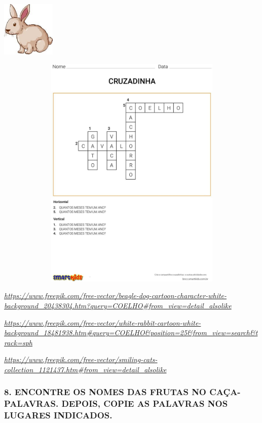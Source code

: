 \includegraphics[width=0.99722in,height=1.03125in]{media/image95.jpg}

\includegraphics[width=5.90556in,height=4.47101in]{media/image96.jpg}

\href{https://www.freepik.com/free-vector/beagle-dog-cartoon-character-white-background_20438304.htm?query=COELHO\#from_view=detail_alsolike}{\emph{https://www.freepik.com/free-vector/beagle-dog-cartoon-character-white-background\_20438304.htm?query=COELHO\#from\_view=detail\_alsolike}}

\href{https://www.freepik.com/free-vector/white-rabbit-cartoon-white-background_18481938.htm\#query=COELHO\&position=25\&from_view=search\&track=sph}{\emph{https://www.freepik.com/free-vector/white-rabbit-cartoon-white-background\_18481938.htm\#query=COELHO\&position=25\&from\_view=search\&track=sph}}

\href{https://www.freepik.com/free-vector/smiling-cats-collection_1121437.htm\#from_view=detail_alsolike}{\emph{https://www.freepik.com/free-vector/smiling-cats-collection\_1121437.htm\#from\_view=detail\_alsolike}}

\subsubsection{8. ENCONTRE OS NOMES DAS FRUTAS NO CAÇA-PALAVRAS. DEPOIS, COPIE AS PALAVRAS NOS LUGARES INDICADOS.}\label{encontre-no-cauxe7a-palavras-os-nomes-das-frutas.-depois-copie-nos-lugares-indicados.}

